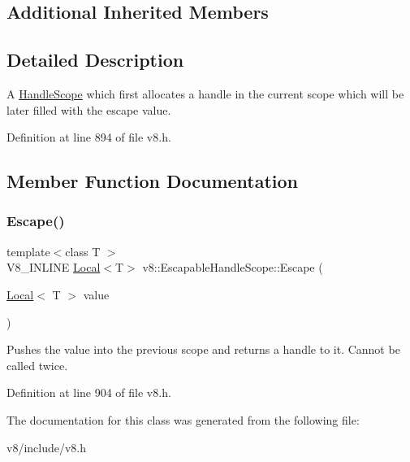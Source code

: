 \subsection*{Additional Inherited Members}


\subsection{Detailed Description}
A \mbox{\hyperlink{classv8_1_1HandleScope}{Handle\+Scope}} which first allocates a handle in the current scope which will be later filled with the escape value. 

Definition at line 894 of file v8.\+h.



\subsection{Member Function Documentation}
\mbox{\label{classv8_1_1EscapableHandleScope_afdf0d3850978f65d1a827f78b3a2b6fd}} 
\subsubsection{\texorpdfstring{Escape()}{Escape()}}
{\footnotesize\ttfamily template$<$class T $>$ \\
V8\+\_\+\+I\+N\+L\+I\+NE \mbox{\hyperlink{classv8_1_1Local}{Local}}$<$T$>$ v8\+::\+Escapable\+Handle\+Scope\+::\+Escape (\begin{DoxyParamCaption}\item[{\mbox{\hyperlink{classv8_1_1Local}{Local}}$<$ T $>$}]{value }\end{DoxyParamCaption})\hspace{0.3cm}{\ttfamily [inline]}}

Pushes the value into the previous scope and returns a handle to it. Cannot be called twice. 

Definition at line 904 of file v8.\+h.



The documentation for this class was generated from the following file\+:\begin{DoxyCompactItemize}
\item 
v8/include/v8.\+h\end{DoxyCompactItemize}
